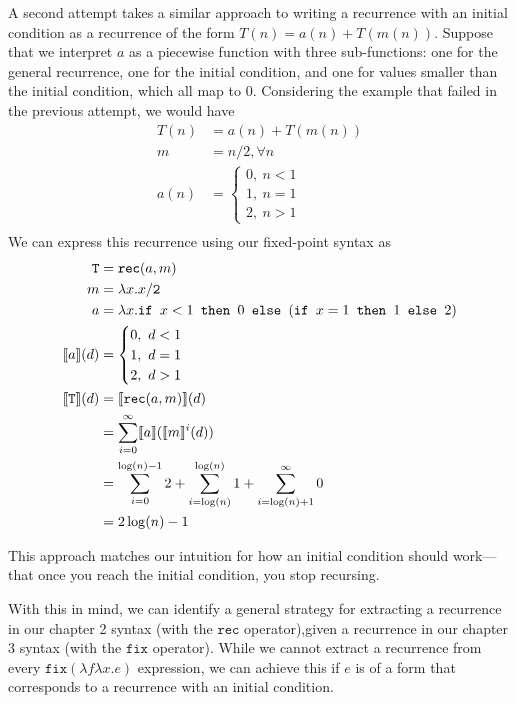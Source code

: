 A second attempt takes a similar approach to writing a recurrence with an initial condition as a recurrence of 
the form $T(n) = a(n) + T(m(n))$. Suppose that we interpret $a$ as a piecewise function with three sub-functions:
one for the general recurrence, one for the initial condition, and one for values smaller than the initial condition, which all
map to $0$. Considering the example that failed in the previous attempt, we would have
\begin{align*}
T(n) &= a(n) + T(m(n)) \\
m &= n/2, \forall n \\
a(n) &=
\begin{cases}
0, \ n < 1 \\
1, \ n = 1 \\
2, \ n > 1
\end{cases} \\
\end{align*}
We can express this recurrence using our fixed-point syntax as
\begin{align*}
\texttt{T} &= \texttt{rec}(a,m) \\
m &= \lambda x.x/\texttt{2} \\
a &= \lambda x.\texttt{if } x <1 \texttt{ then } 0 \texttt{ else } (\texttt{if } x = 1 \texttt{ then } 1 \texttt{ else } 2) \\
\llbracket a \rrbracket(d) &= 
 \begin{cases}
0, \ d < 1 \\
1, \ d = 1 \\
2, \ d > 1 
\end{cases} \\
\llbracket \texttt{T} \rrbracket(d) &= \llbracket \texttt{rec}(a,m)\rrbracket(d) \\
&= \sum_{i=0}^{\infty}\llbracket a \rrbracket(\llbracket m\rrbracket^i(d)) \\
&= \sum_{i=0}^{\log(n)-1} 2 + \sum_{i=\log(n) }^{\log(n)} 1 + \sum_{i = \log(n) + 1}^{\infty} 0 \\
&= 2\log(n) - 1
\end{align*}

This approach matches our intuition for how an initial condition should work---that once you reach the initial condition,
you stop recursing. 

With this in mind, we can identify a general strategy for extracting a recurrence in our chapter 2 syntax (with
the $\texttt{rec}$ operator),given a recurrence in our chapter 3 syntax (with the $\texttt{fix}$ operator). 
While we cannot extract a recurrence from every $\texttt{fix}(\lambda f \lambda x.e)$ expression, we can achieve this
if $e$ is of a form that corresponds to a recurrence with an initial condition. 

